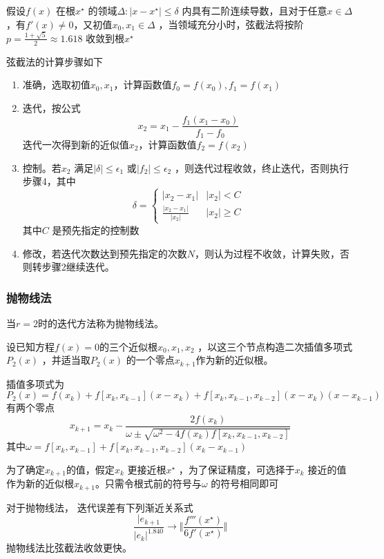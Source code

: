 \documentclass[a4paper]{article}
\begin{document}
\begin{theorem}
	假设$f(x)$ 在根$x^{\star}$ 的领域$\Delta : | x - x^{\star} | \le \delta$ 内具有二阶连续导数，且对于任意$x \in \Delta$，有$f'(x) \neq 0$，又初值$x_0, x_1 \in \Delta$ ，当领域充分小时，弦截法将按阶$p = \frac{1 + \sqrt{5} }{2} \approx 1.618$ 收敛到根$x^{\star}$ 
\end{theorem}

弦截法的计算步骤如下
\begin{enumerate}
	\item 准确，选取初值$x_0, x_1$，计算函数值$f_0 = f(x_0), f_1 = f(x_1)$ 
	\item 迭代，按公式
		\[
		x_2 = x_1 - \frac{f_1 (x_1 - x_0)}{f_1 - f_0}
		\] 
		迭代一次得到新的近似值$x_2$，计算函数值$f_2 = f(x_2)$
	\item 控制。若$x_2$ 满足$|\delta| \le \epsilon_1$ 或$|f_2| \le \epsilon_2$ ，则迭代过程收敛，终止迭代，否则执行步骤4，其中
		\[
		\delta = \begin{cases}
			|x_2 - x_1| & |x_2| < C \\
			\frac{|x_2 - x_1|}{|x_2|} & |x_2| \ge C
		\end{cases} 
		\] 
		其中$C$ 是预先指定的控制数
	\item 修改，若迭代次数达到预先指定的次数$N$，则认为过程不收敛，计算失败，否则转步骤2继续迭代。
\end{enumerate}

\subsubsection{抛物线法}
当$r=2$时的迭代方法称为抛物线法。

设已知方程$f(x) = 0$的三个近似根$x_0, x_1, x_2$ ，以这三个节点构造二次插值多项式$P_2(x)$ ，并适当取$P_2(x)$ 的一个零点$x_{k+1}$作为新的近似根。

插值多项式为
\[
	P_2(x) = f(x_{k}) + f[x_{k}, x_{k-1}] (x - x_{k}) + f[x_{k}, x_{k-1}, x_{k-2}] (x - x_{k}) (x - x_{k-1})
\] 
有两个零点
\[
	x_{k+1} = x_{k} - \frac{2 f(x_{k})}{\omega \pm \sqrt{\omega^2 - 4 f(x_{k}) f[x_{k}, x_{k-1}, x_{k-2}]} }\tag{5.4.3} \label{eq:5.4.3} 
\] 
其中$\omega = f[x_{k}, x_{k-1}] + f[x_{k}, x_{k-1}, x_{k-2}] (x_{k} - x_{k-1})$

为了确定$x_{k+1}$的值，假定$x_{k}$ 更接近根$x^{\star}$ ，为了保证精度，可选择于$x_{k}$ 接近的值作为新的近似根$x_{k+1}$。只需令根式前的符号与$\omega$ 的符号相同即可

对于抛物线法， 迭代误差有下列渐近关系式
\[
\frac{|e_{k+1}}{|e_k|^{1.840}} \to \Vert \frac{f'''(x^{\star})}{6 f'(x^{\star})} \Vert 
\] 
抛物线法比弦截法收敛更快。
\end{document}
